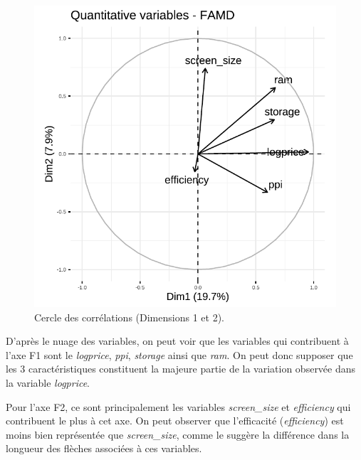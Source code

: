 \documentclass[
  12pt,
]{report}
\begin{document}
\begin{figure}[H]

{\centering \includegraphics{report_files/figure-pdf/unnamed-chunk-15-1.pdf}

}

\caption{Cercle des corrélations (Dimensions 1 et 2).}

\end{figure}%

D'après le nuage des variables, on peut voir que les variables qui
contribuent à l'axe F1 sont le \emph{logprice}, \emph{ppi},
\emph{storage} ainsi que \emph{ram}. On peut donc supposer que les 3
caractéristiques constituent la majeure partie de la variation observée
dans la variable \emph{logprice}.

Pour l'axe F2, ce sont principalement les variables \emph{screen\_size}
et \emph{efficiency} qui contribuent le plus à cet axe. On peut observer
que l'efficacité (\emph{efficiency}) est moins bien représentée que
\emph{screen\_size}, comme le suggère la différence dans la longueur des
flèches associées à ces variables.
\end{document}
